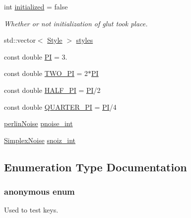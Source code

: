 \begin{DoxyCompactItemize}
\item 
int \hyperlink{namespacecprocessing_abe1272b16cf18357f89ae10c184fbcd2}{initialized} = false
\begin{DoxyCompactList}\small\item\em \-Whether or not initialization of glut took place. \end{DoxyCompactList}\item 
std\-::vector$<$ \hyperlink{classcprocessing_1_1Style}{\-Style} $>$ \hyperlink{namespacecprocessing_a58f7198a2386df8ea3559ea578069388}{styles}
\item 
const double \hyperlink{namespacecprocessing_a445521f2b665e4744680faa4a6806676}{\-P\-I} = 3.
\item 
const double \hyperlink{namespacecprocessing_aa9c16baaa88d39db100f54cb0bbca62f}{\-T\-W\-O\-\_\-\-P\-I} = 2$\ast$\hyperlink{namespacecprocessing_a445521f2b665e4744680faa4a6806676}{\-P\-I}
\item 
const double \hyperlink{namespacecprocessing_a257bee644c97e92e9f9492c569ab863d}{\-H\-A\-L\-F\-\_\-\-P\-I} = \hyperlink{namespacecprocessing_a445521f2b665e4744680faa4a6806676}{\-P\-I}/2
\item 
const double \hyperlink{namespacecprocessing_aa4fa2ff3538b68df8b95c6eba6c33a28}{\-Q\-U\-A\-R\-T\-E\-R\-\_\-\-P\-I} = \hyperlink{namespacecprocessing_a445521f2b665e4744680faa4a6806676}{\-P\-I}/4
\item 
\hyperlink{classcprocessing_1_1perlinNoise}{perlin\-Noise} \hyperlink{namespacecprocessing_ae49abeea91d685f9a38c0b20b0de1977}{pnoise\-\_\-int}
\item 
\hyperlink{classcprocessing_1_1SimplexNoise}{\-Simplex\-Noise} \hyperlink{namespacecprocessing_aab81f757257f375ea414cd3a49483e4c}{snoiz\-\_\-int}
\end{DoxyCompactItemize}


\subsection{\-Enumeration \-Type \-Documentation}
\hypertarget{namespacecprocessing_accea6f128c16246ebc5d97249bef2798}{\subsubsection[{anonymous enum}]{\setlength{\rightskip}{0pt plus 5cm}anonymous enum}}\label{namespacecprocessing_accea6f128c16246ebc5d97249bef2798}


\-Used to test keys. 

